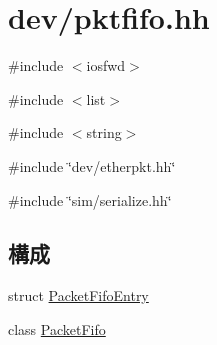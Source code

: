 \hypertarget{pktfifo_8hh}{
\section{dev/pktfifo.hh}
\label{pktfifo_8hh}
}
{\ttfamily \#include $<$iosfwd$>$}\par
{\ttfamily \#include $<$list$>$}\par
{\ttfamily \#include $<$string$>$}\par
{\ttfamily \#include \char`\"{}dev/etherpkt.hh\char`\"{}}\par
{\ttfamily \#include \char`\"{}sim/serialize.hh\char`\"{}}\par
\subsection*{構成}
\begin{DoxyCompactItemize}
\item 
struct \hyperlink{structPacketFifoEntry}{PacketFifoEntry}
\item 
class \hyperlink{classPacketFifo}{PacketFifo}
\end{DoxyCompactItemize}
